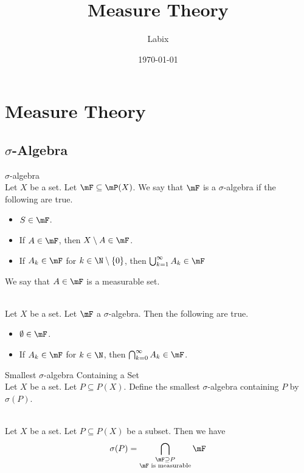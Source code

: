 \documentclass[a4paper]{article}
\title{Measure Theory}
\author{Labix}
\date{\today}
\begin{document}
\maketitle
\begin{abstract}
\end{abstract}
\pagebreak
\tableofcontents
\pagebreak

\section{Measure Theory}
\subsection{$\sigma$-Algebra}
\begin{defn}{$\sigma$-algebra}{}\\
Let $X$ be a set. Let $\mF\subseteq\mP(X)$. We say that $\mF$ is a $\sigma$-algebra if the following are true. 
\begin{itemize}
\item $S\in\mF$. 
\item If $A\in\mF$, then $X\setminus A\in\mF$. 
\item If $A_k\in\mF$ for $k\in\N\setminus\{0\}$, then $\bigcup_{k=1}^\infty A_k\in\mF$
\end{itemize}
We say that $A\in\mF$ is a measurable set. 
\end{defn}

\begin{lmm}{}{}\\
Let $X$ be a set. Let $\mF$ a $\sigma$-algebra. Then the following are true. 
\begin{itemize}
\item $\emptyset\in\mF$. 
\item If $A_k\in\mF$ for $k\in\N$, then $\bigcap_{k=0}^\infty A_k\in\mF$. 
\end{itemize}
\end{lmm}

\begin{defn}{Smallest $\sigma$-algebra Containing a Set}{}\\
Let $X$ be a set. Let $P\subseteq P(X)$. Define the smallest $\sigma$-algebra containing $P$ by $\sigma(P)$. 
\end{defn}

\begin{lmm}{}{}\\
Let $X$ be a set. Let $P\subseteq P(X)$ be a subset. Then we have $$\sigma(P)=\bigcap_{\substack{\mF\supseteq P\\\mF\text{ is measurable}}}\mF$$
\end{lmm}
\end{document}
